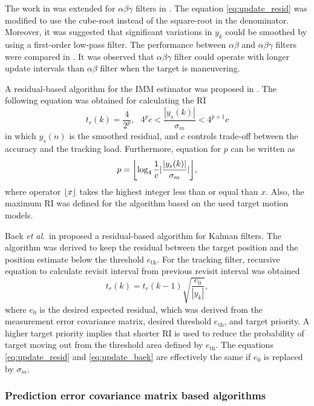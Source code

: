 \documentclass[english, 12pt, a4paper, elec, utf8, a-1b, online]{aaltothesis}
\numberwithin{equation}{section}
\newcommand{\etal}{\textit{et al}.~}
\newcommand{\ri}{t_r}
\DeclarePairedDelimiter\floor{\lfloor}{\rfloor}
\begin{document}
The work in \cite{Cohen1986} was extended for $\alpha\beta\gamma$ filters \cite{Brookner1998} in \cite{Gardner1988}. 
The equation \eqref{eq:update_resid} was modified to use the cube-root instead of the square-root in the denominator.
Moreover, it was suggested that significant variations in $y_k$ could be smoothed by using a first-order low-pass filter.
The performance between $\alpha\beta$ and $\alpha\beta\gamma$ filters were compared in \cite{Munu1992}.
It was observed that $\alpha\beta\gamma$ filter could operate with longer update intervals than $\alpha\beta$ filter when the target is maneuvering.

A residual-based algorithm for the IMM estimator was proposed in \cite{ChengTing2007}.
The following equation was obtained for calculating the RI
\begin{equation}
    \ri(k) = \frac{4}{2^p}, \text{ } 4^p c < \frac{|y_s(k)|}{\sigma_m} < 4^{p+1}c
\end{equation}
in which $y_s(n)$ is the smoothed residual, and $c$ controls trade-off between the accuracy and the tracking load.
Furthermore, equation for $p$ can be written as
\begin{equation}
    p = \floor*{\log_4\frac{1}{c}|\frac{|y_s(k)|}{\sigma_m}|},
\end{equation}
where operator $\floor*{x}$ takes the highest integer less than or equal than $x$.
Also, the maximum RI was defined for the algorithm based on the used target motion models.

Baek \etal in \cite{Baek2010} proposed a residual-based algorithm for Kalman filters.
The algorithm was derived to keep the residual between the target position and the position estimate below the threshold $e_\text{th}$.
For the tracking filter, recursive equation to calculate revisit interval from previous revisit interval was obtained
\begin{equation}\label{eq:update_baek}
    \ri(k) = \ri(k - 1) \sqrt{\frac{e_0}{|y_k|}},
\end{equation}
where $e_0$ is the desired expected residual, which was derived from the measurement error covariance matrix, desired threshold $e_\text{th}$, and target priority.
A higher target priority implies that shorter RI is used to reduce the probability of target moving out from the threshold area defined by $e_\text{th}$.
The equations \eqref{eq:update_resid} and \eqref{eq:update_baek} are effectively the same if $e_0$ is replaced by $\sigma_m$.


\subsubsection{Prediction error covariance matrix based algorithms}
\end{document}
